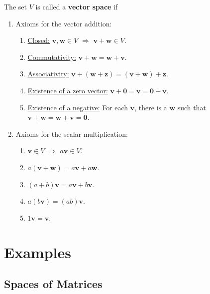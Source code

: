 \documentclass[20pt,a4paper]{extarticle}
\begin{document}
The set $V$ is called a \textbf{vector space} if
	\begin{enumerate}
		\item Axioms for the vector addition:
			\begin{enumerate}[label=\fbox{A\arabic*.}]
				\item \underline{Closed:} $\mathbf{v} , \mathbf{w} \in V$ $\Rightarrow$ $\mathbf{v} + \mathbf{w} \in V$.
				\item \underline{Commutativity:} $\mathbf{v} + \mathbf{w} = \mathbf{w} + \mathbf{v}$.
				\item \underline{Associativity:} $\mathbf{v} + (\mathbf{w} + \mathbf{z} ) = (\mathbf{v} + \mathbf{w} ) + \mathbf{z}$.
				\item \underline{Existence of a zero vector:} $\mathbf{v} + \mathbf{0} = \mathbf{v} = \mathbf{0} + \mathbf{v}$. 
				\item \underline{Existence of a negative:} For each $\mathbf{v}$, there is a $\mathbf{w}$ such that $\mathbf{v} + \mathbf{w} = \mathbf{w} + \mathbf{v} = \mathbf{0}$.
			\end{enumerate}
		\item Axioms for the scalar multiplication: 
			\begin{enumerate}[label=\fbox{S\arabic*.}]
				\item $\mathbf{v} \in V$ $\Rightarrow$ $a \mathbf{v} \in V$.
				\item $a (\mathbf{v} + \mathbf{w}) = a \mathbf{v} + a \mathbf{w}$. 
				\item $(a + b) \mathbf{v} = a \mathbf{v} + b \mathbf{v}$.
				\item $a (b \mathbf{v}) = (ab) \mathbf{v}$.
				\item $1 \mathbf{v} = \mathbf{v}$.
			\end{enumerate}
	\end{enumerate}


\newpage 

\section{Examples}

\subsection{Spaces of Matrices}
\end{document}
